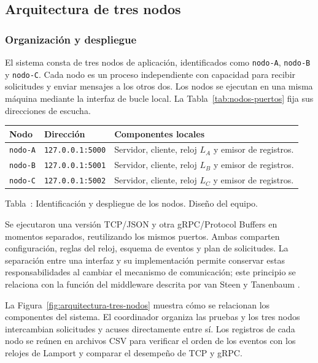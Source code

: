 \subsection{Arquitectura de tres nodos}
\label{sec:arquitectura-nodos}

\subsubsection{Organización y despliegue}

El sistema consta de tres nodos de aplicación, identificados como
\texttt{nodo-A}, \texttt{nodo-B} y \texttt{nodo-C}. Cada nodo es un proceso
independiente con capacidad para recibir solicitudes y enviar mensajes a los otros
dos. Los nodos se ejecutan en una misma máquina mediante la interfaz de bucle
local. La Tabla~\ref{tab:nodos-puertos} fija sus direcciones de escucha.

\begingroup
\small
\renewcommand{\arraystretch}{1.2}
\noindent\begin{tabular}{@{}p{2.2cm}p{4.4cm}p{8.0cm}@{}}
\toprule
Nodo & Dirección & Componentes locales \\
\midrule
\texttt{nodo-A} & \texttt{127.0.0.1:5000} & Servidor, cliente, reloj $L_A$ y emisor de registros. \\
\texttt{nodo-B} & \texttt{127.0.0.1:5001} & Servidor, cliente, reloj $L_B$ y emisor de registros. \\
\texttt{nodo-C} & \texttt{127.0.0.1:5002} & Servidor, cliente, reloj $L_C$ y emisor de registros. \\
\bottomrule
\end{tabular}
\endgroup
\begin{center}
\label{tab:nodos-puertos}
\small Tabla~\thetable: Identificación y despliegue de los nodos. Diseño del equipo.
\end{center}

Se ejecutaron una versión TCP/JSON y otra gRPC/Protocol Buffers en momentos
separados, reutilizando los mismos puertos. Ambas comparten configuración,
reglas del reloj, esquema de eventos y plan de solicitudes. La separación entre
una interfaz y su implementación permite conservar estas responsabilidades al
cambiar el mecanismo de comunicación; este principio se relaciona con la función
del middleware descrita por van Steen y Tanenbaum
\cite[pp.~11--13]{belinda_vansteen2023_distributed}.

La Figura~\ref{fig:arquitectura-tres-nodos} muestra cómo se relacionan los
componentes del sistema. El coordinador organiza las pruebas y los tres nodos
intercambian solicitudes y acuses directamente entre sí. Los registros de cada
nodo se reúnen en archivos CSV para verificar el orden de los eventos con los
relojes de Lamport y comparar el desempeño de TCP y gRPC.

